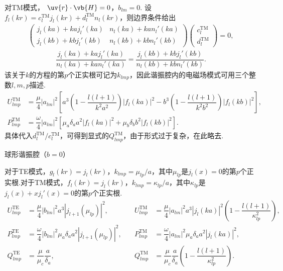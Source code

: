 对TM模式，
\(\uv{r} \cdot \vb{H} = 0\)，\(b_{lm} = 0\).
设\(f_l(kr) = c_l^{\text{TM}} j_l(kr) + d_l^{\text{TM}} n_l(kr)\)，则边界条件给出
\begin{align*}
	\begin{pmatrix} j_l(ka) + ka j_l'(ka) & n_l(ka) + ka n_l'(ka) \\ j_l(kb) + kb j_l'(kb) & n_l(kb) + kb n_l'(kb) \end{pmatrix} \begin{pmatrix} c_l^{\text{TM}} \\ d_l^{\text{TM}} \end{pmatrix} = 0,
\end{align*}
\begin{align*}
	\dfrac{j_l(ka) + ka j_l'(ka)}{n_l(ka) + ka n_l'(ka)} = \dfrac{j_l(kb) + kb j_l'(kb)}{n_l(kb) + kb n_l'(kb)}.
\end{align*}
该关于\(k\)的方程的第\(p\)个正实根可记为\(k_{lmp}\)，因此谐振腔内的电磁场模式可用三个整数\(l, m, p\)描述.
\begin{align*}
	U_{lmp}^{\text{TM}} &= \dfrac{\mu}{4} |a_{lm}|^2 \left[ a^3 \left( 1 - \dfrac{l(l+1)}{k^2 a^2} \right) |f_l(ka)|^2 - b^3 \left( 1 - \dfrac{l(l+1)}{k^2 b^2} \right) |f_l(kb)|^2 \right],\\
	P_{lmp}^{\text{TM}} &= \dfrac{\omega}{4} |a_{lm}|^2 \left[ \mu_a \delta_a a^2 |f_l(ka)|^2 + \mu_b \delta_b b^2 |f_l(kb)|^2 \right].
\end{align*}
具体代入\(d_l^{\text{TM}}/c_l^{\text{TM}}\)，可得到显式的\(Q_{lmp}^{\text{TM}}\)，由于形式过于复杂，在此略去.

\begin{exbox}
	球形谐振腔（\(b = 0\)）

	对于TE模式，\(g_l(kr) = j_l(kr)\)，\(k_{lmp} = \mu_{lp}/a\)，其中\(\mu_{lp}\)是\(j_l(x) = 0\)的第\(p\)个正实根.对于TM模式，\(f_l(kr) = j_l(kr)\)，\(k_{lmp} = \kappa_{lp}/a\)，其中\(\kappa_{lp}\)是\(j_l(x) + x j_l'(x) = 0\)的第\(p\)个正实根.
	\begin{equation*}
		\begin{aligned}
			U_{lmp}^{\text{TE}} & = \dfrac{\mu}{4} |b_{lm}|^2 a^3 |j_{l+1}(\mu_{lp})|^2, \quad                   & U_{lmp}^{\text{TM}} & = \dfrac{\mu}{4} |a_{lm}|^2 a^3 |j_l(ka)|^2 \left( 1 - \dfrac{l(l+1)}{\kappa_{lp}^2} \right), \\
			P_{lmp}^{\text{TE}} & = \dfrac{\omega}{4} |b_{lm}|^2 \mu_a \delta_a a^2 |j_{l+1}(\mu_{lp})|^2, \quad & P_{lmp}^{\text{TM}} & = \dfrac{\omega}{4} |a_{lm}|^2 \mu_a \delta_a a^2 |j_l(ka)|^2,                                \\
			Q_{lmp}^{\text{TE}} & = \dfrac{\mu}{\mu_c} \dfrac{a}{\delta_a}, \quad                                & Q_{lmp}^{\text{TM}} & = \dfrac{\mu}{\mu_c} \dfrac{a}{\delta_a} \left( 1 - \dfrac{l(l+1)}{\kappa_{lp}^2} \right).
		\end{aligned}
	\end{equation*}
\end{exbox}

